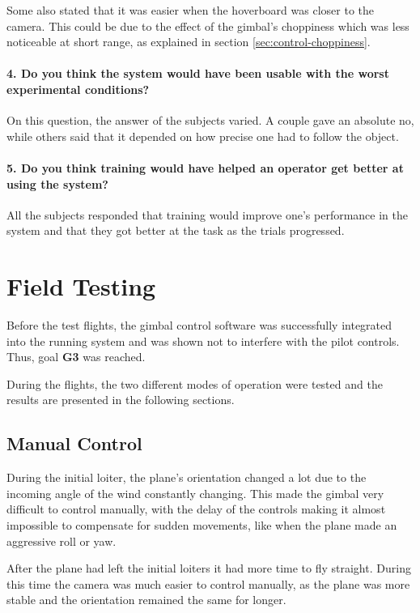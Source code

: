 \documentclass[nofilelist]{cslthse-msc}
\begin{document}
Some also stated that it was easier when the hoverboard was closer to the camera. This could be due to the effect of the gimbal's choppiness which was less noticeable at short range, as explained in section \ref{sec:control-choppiness}.

\paragraph{4. Do you think the system would have been usable with the worst experimental conditions?}
On this question, the answer of the subjects varied. A couple gave an absolute no, while others said that it depended on how precise one had to follow the object. 

\paragraph{5. Do you think training would have helped an operator get better at using the system?}
All the subjects responded that training would improve one's performance in the system and that they got better at the task as the trials progressed. 

\section{Field Testing}
Before the test flights, the gimbal control software was successfully integrated into the running system and was shown not to interfere with the pilot controls. Thus, goal \textbf{G3} was reached.

During the flights, the two different modes of operation were tested and the results are presented in the following sections.

\subsection{Manual Control}
During the initial loiter, the plane's orientation changed a lot due to the incoming angle of the wind constantly changing. This made the gimbal very difficult to control manually, with the delay of the controls making it almost impossible to compensate for sudden movements, like when the plane made an aggressive roll or yaw.

After the plane had left the initial loiters it had more time to fly straight. During this time the camera was much easier to control manually, as the plane was more stable and the orientation remained the same for longer. 
\end{document}
